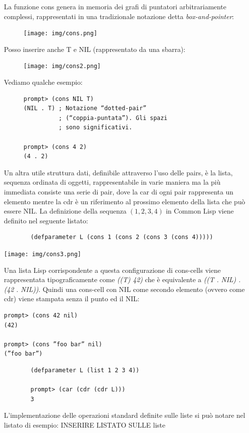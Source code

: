 \documentclass[a4paper]{book}
\begin{document}
La funzione cons genera in memoria dei grafi di puntatori arbitrariamente complessi, rappresentati in una tradizionale notazione
detta \textit{box-and-pointer}:
\begin{figure}
\centering
\texttt{[image: img/cons.png]}
\end{figure}
Posso inserire anche T e NIL (rappresentato da una sbarra):
\begin{figure}
\texttt{[image: img/cons2.png]}
\end{figure}
Vediamo qualche esempio:
\begin{figure}
\begin{verbatim}
prompt> (cons NIL T)
(NIL . T) ; Notazione “dotted-pair”
          ; (“coppia-puntata”). Gli spazi
          ; sono significativi.

prompt> (cons 4 2)
(4 . 2)
\end{verbatim}
\end{figure}
Un altra utile struttura dati, definibile attraverso l'uso delle pairs, è la lista, sequenza ordinata di oggetti, rappresentabile in varie maniera
ma la più immediata consiste una serie di pair, dove la car di ogni pair rappresenta un elemento mentre la cdr è un riferimento
al prossimo elemento della lista che può essere NIL.\newline
La definizione della sequenza $(1, 2, 3, 4)$ in Common Lisp viene definito nel seguente listato:
\begin{figure}
\begin{verbatim}
  (defparameter L (cons 1 (cons 2 (cons 3 (cons 4)))))
\end{verbatim}
\end{figure}

\begin{center}
  \texttt{[image: img/cons3.png]}
\end{center}
Una lista Lisp corrispondente a questa configurazione di cons-cells viene rappresentata tipograficamente come \textit{((T) 42)} che è equivalente
a \textit{((T . NIL) . (42 . NIL))}.\newline
Quindi una cons-cell con NIL come secondo elemento (ovvero come cdr) viene stampata senza il punto ed il NIL:
\begin{verbatim}
prompt> (cons 42 nil)
(42)

prompt> (cons ”foo bar” nil)
(”foo bar”)
\end{verbatim}

\begin{figure}
\begin{verbatim}
  (defparameter L (list 1 2 3 4))

  prompt> (car (cdr (cdr L)))
  3
\end{verbatim}
\end{figure}
L'implementazione delle operazioni standard definite sulle liste si può notare
nel listato di esempio:
INSERIRE LISTATO SULLE liste
\end{document}
